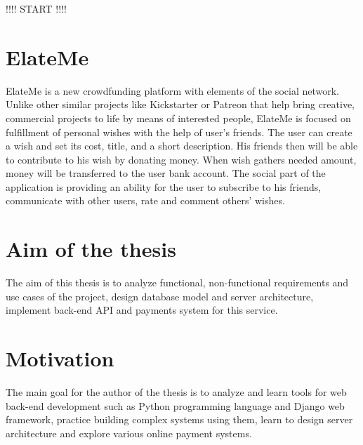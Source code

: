 !!!! START !!!!


\section{ElateMe}
ElateMe is a new crowdfunding platform with elements of the social network. Unlike other similar projects like
Kickstarter or Patreon that help bring creative, commercial projects to life by means of interested people, ElateMe
is focused on fulfillment of personal wishes with the help of user’s friends. The user can create a wish and set
its cost, title, and a short description. His friends then will be able to contribute to his wish by donating money.
When wish gathers needed amount, money will be transferred to the user bank account. The social part of the
application is providing an ability for the user to subscribe to his friends, communicate with other users,
rate and comment others’ wishes.\par

\section{Aim of the thesis}
The aim of this thesis is to analyze functional, non-functional requirements and use cases of the project, design
database model and server architecture, implement back-end \ac{API} and payments system for this service.

\section{Motivation}
The main goal for the author of the thesis is to analyze and learn tools for web back-end development such as Python
programming language and Django web framework, practice building complex systems using them, learn to design server
architecture and explore various online payment systems.\par
